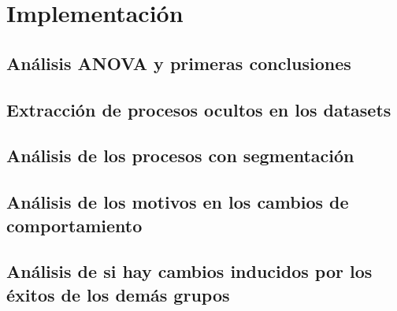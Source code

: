 \chapter{Implementación}
	\label{chap:six}
	
\section{Análisis ANOVA y primeras conclusiones}


\section{Extracción de procesos ocultos en los datasets}


\section{Análisis de los procesos con segmentación}


\section{Análisis de los motivos en los cambios de comportamiento}


\section{Análisis de si hay cambios inducidos por los éxitos de los demás grupos}
